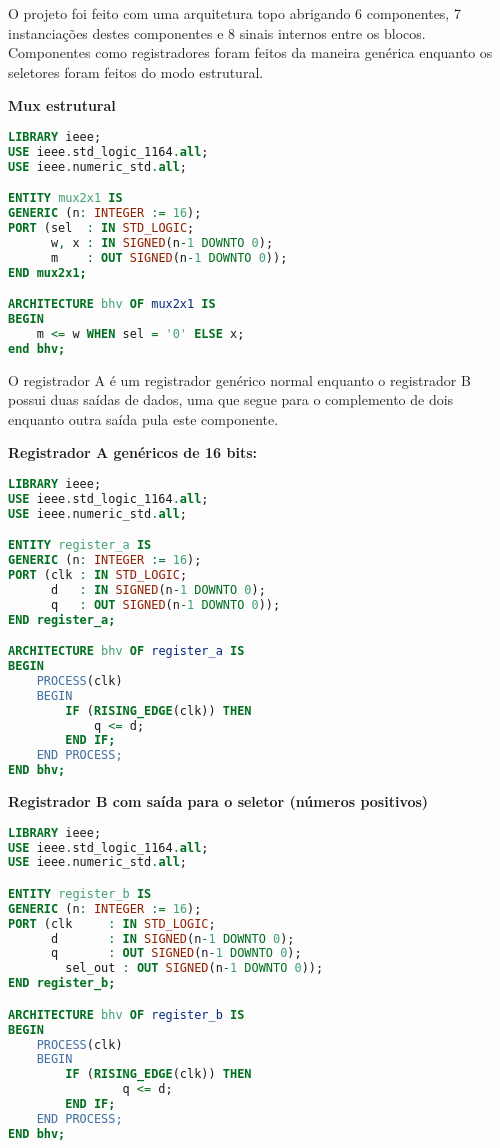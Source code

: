 \documentclass[a4paper]{article}
\begin{document}
O projeto foi feito com uma arquitetura topo abrigando 6 componentes, 7 instanciações destes componentes e 8 sinais internos entre os blocos. 
Componentes como registradores foram feitos da maneira genérica enquanto os seletores foram feitos do modo estrutural.
\bigskip

\textbf{Mux estrutural}
\begin{lstlisting}[language=VHDL]
LIBRARY ieee;
USE ieee.std_logic_1164.all;
USE ieee.numeric_std.all;

ENTITY mux2x1 IS
GENERIC (n: INTEGER := 16);
PORT (sel  : IN STD_LOGIC;
      w, x : IN SIGNED(n-1 DOWNTO 0);
	  m    : OUT SIGNED(n-1 DOWNTO 0));
END mux2x1;

ARCHITECTURE bhv OF mux2x1 IS
BEGIN
    m <= w WHEN sel = '0' ELSE x;
end bhv;
\end{lstlisting}
\bigskip

O registrador A é um registrador genérico normal enquanto o registrador B possui duas saídas de dados, uma que segue para o complemento de dois enquanto outra saída pula este componente.
\bigskip

\textbf{Registrador A genéricos de 16 bits:}
\begin{lstlisting}[language=VHDL]
LIBRARY ieee;
USE ieee.std_logic_1164.all;
USE ieee.numeric_std.all;

ENTITY register_a IS
GENERIC (n: INTEGER := 16);
PORT (clk : IN STD_LOGIC;
      d   : IN SIGNED(n-1 DOWNTO 0);
      q   : OUT SIGNED(n-1 DOWNTO 0));
END register_a;

ARCHITECTURE bhv OF register_a IS
BEGIN
    PROCESS(clk)
    BEGIN
        IF (RISING_EDGE(clk)) THEN
			q <= d;
        END IF;
    END PROCESS;
END bhv;
\end{lstlisting}

\pagebreak
\textbf{Registrador B com saída para o seletor (números positivos)}
\begin{lstlisting}[language=VHDL]
LIBRARY ieee;
USE ieee.std_logic_1164.all;
USE ieee.numeric_std.all;

ENTITY register_b IS
GENERIC (n: INTEGER := 16);
PORT (clk     : IN STD_LOGIC;
      d       : IN SIGNED(n-1 DOWNTO 0);
      q       : OUT SIGNED(n-1 DOWNTO 0);
		sel_out : OUT SIGNED(n-1 DOWNTO 0));
END register_b;

ARCHITECTURE bhv OF register_b IS
BEGIN
    PROCESS(clk)
    BEGIN
        IF (RISING_EDGE(clk)) THEN
				q <= d;
        END IF;
    END PROCESS;
END bhv;
\end{lstlisting}
\smallskip
\end{document}
